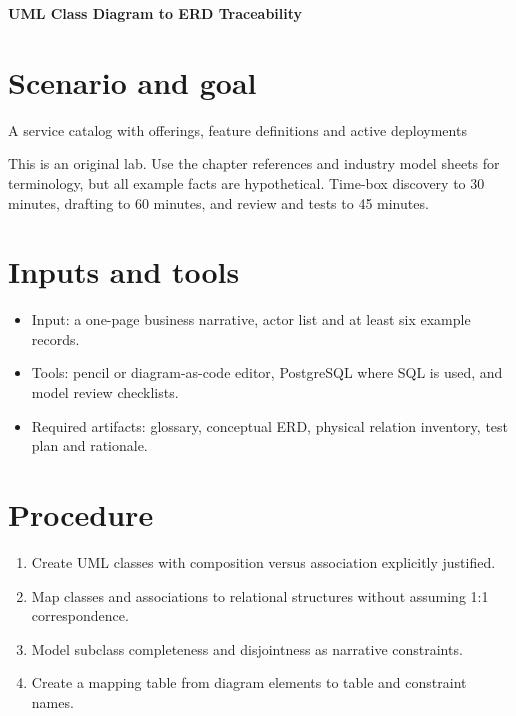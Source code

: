 \documentclass[11pt,letterpaper]{article}
\begin{document}
\begin{center}
{\LARGE\bfseries\color{navy} UML Class Diagram to ERD Traceability}\par
\vspace{0.25em}{\large Practical modeling laboratory}\par
{}
\end{center}
\vspace{0.8em}
\section{Scenario and goal}
A service catalog with offerings, feature definitions and active deployments

This is an original lab. Use the chapter references and industry model sheets for terminology, but all example facts are hypothetical. Time-box discovery to 30 minutes, drafting to 60 minutes, and review and tests to 45 minutes.


\section{Inputs and tools}
\begin{itemize}
\item Input: a one-page business narrative, actor list and at least six example records.
\item Tools: pencil or diagram-as-code editor, PostgreSQL where SQL is used, and model review checklists.
\item Required artifacts: glossary, conceptual ERD, physical relation inventory, test plan and rationale.
\end{itemize}

\section{Procedure}
\begin{enumerate}
\item Create UML classes with composition versus association explicitly justified.
\item Map classes and associations to relational structures without assuming 1:1 correspondence.
\item Model subclass completeness and disjointness as narrative constraints.
\item Create a mapping table from diagram elements to table and constraint names.
\end{enumerate}
\end{document}

